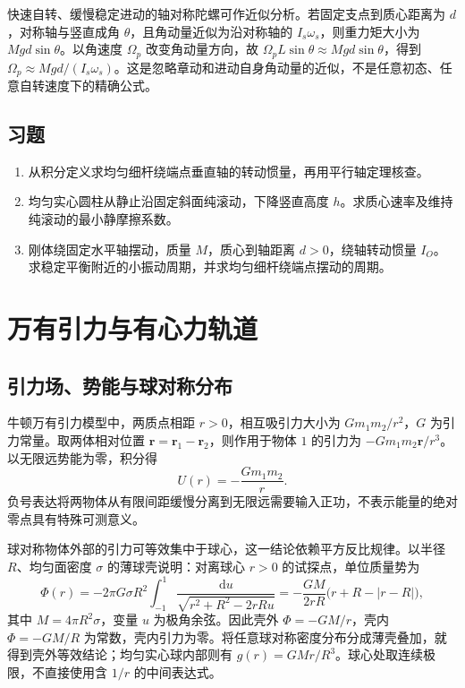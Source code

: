 \documentclass[UTF8,12pt,a4paper,fontset=fandol]{ctexbook}
\begin{document}
快速自转、缓慢稳定进动的轴对称陀螺可作近似分析。若固定支点到质心距离为 $d$，对称轴与竖直成角 $\theta$，且角动量近似为沿对称轴的 $I_s\omega_s$，则重力矩大小为 $Mgd\sin\theta$。以角速度 $\Omega_p$ 改变角动量方向，故 $\Omega_p L\sin\theta\approx Mgd\sin\theta$，得到 $\Omega_p\approx Mgd/(I_s\omega_s)$。这是忽略章动和进动自身角动量的近似，不是任意初态、任意自转速度下的精确公式。

\section{习题}
\begin{enumerate}[label=\thechapter.\arabic*,ref=\thechapter.\arabic*]
\item\label{exr:mech-rod-I} 从积分定义求均匀细杆绕端点垂直轴的转动惯量，再用平行轴定理核查。
\item\label{exr:mech-disc-roll} 均匀实心圆柱从静止沿固定斜面纯滚动，下降竖直高度 $h$。求质心速率及维持纯滚动的最小静摩擦系数。
\item\label{exr:mech-physical-pendulum} 刚体绕固定水平轴摆动，质量 $M$，质心到轴距离 $d>0$，绕轴转动惯量 $I_O$。求稳定平衡附近的小振动周期，并求均匀细杆绕端点摆动的周期。
\end{enumerate}

\chapter{万有引力与有心力轨道}
\label{chap:mech-gravity}

\section{引力场、势能与球对称分布}
牛顿万有引力模型中，两质点相距 $r>0$，相互吸引力大小为 $Gm_1m_2/r^2$，$G$ 为引力常量。取两体相对位置 $\mathbf r=\mathbf r_1-\mathbf r_2$，则作用于物体 $1$ 的引力为 $-Gm_1m_2\mathbf r/r^3$。以无限远势能为零，积分得
\begin{equation}
 U(r)=-\frac{Gm_1m_2}{r}.
 \label{eq:mech-gravity-U}
\end{equation}
负号表达将两物体从有限间距缓慢分离到无限远需要输入正功，不表示能量的绝对零点具有特殊可测意义。

球对称物体外部的引力可等效集中于球心，这一结论依赖平方反比规律。以半径 $R$、均匀面密度 $\sigma$ 的薄球壳说明：对离球心 $r>0$ 的试探点，单位质量势为
\[
 \Phi(r)=-2\pi G\sigma R^2\int_{-1}^1\frac{\mathrm du}{\sqrt{r^2+R^2-2rRu}}
 =-\frac{GM}{2rR}\bigl(r+R-|r-R|\bigr),
\]
其中 $M=4\pi R^2\sigma$，变量 $u$ 为极角余弦。因此壳外 $\Phi=-GM/r$，壳内 $\Phi=-GM/R$ 为常数，壳内引力为零。将任意球对称密度分布分成薄壳叠加，就得到壳外等效结论；均匀实心球内部则有 $g(r)=GMr/R^3$。球心处取连续极限，不直接使用含 $1/r$ 的中间表达式。
\end{document}
